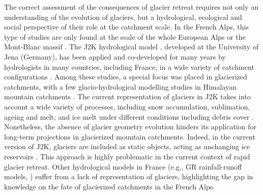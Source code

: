 The correct assessment of the consequences of glacier retreat requires not only an understanding of the evolution of glaciers, but a hydrological, ecological and social perspective of their role at the catchment scale. In the French Alps, this type of studies are only found at the scale of the whole European Alps \citep{coppola_impact_2018} or the Mont-Blanc massif \citep{laurent_impact_2020}. The J2K hydrological model \citep{krause_quantifying_2002}, developed at the University of Jena (Germany), has been applied and co-developed for many years by hydrologists in many countries, including France, in a wide variety of catchment configurations \citep{branger_investigating_2012, braud_j2000-rhone_2017, horner_information_2020}. Among these studies, a special focus was placed in glacierized catchments, with a few glacio-hydrological modelling studies in Himalayan mountain catchments \citep{gao_test_2012, nepal_understanding_2014}. The current representation of glaciers in J2K takes into account a wide variety of processes, including snow accumulation, sublimation, ageing and melt; and ice melt under different conditions including debris cover \citep{nepal_understanding_2014}. Nonetheless, the absence of glacier geometry evolution hinders its application for long-term projections in glacierized mountain catchments. Indeed, in the current version of J2K, glaciers are included as static objects, acting as unchanging ice reservoirs \citep{nepal_understanding_2014}. This approach is highly problematic in the current context of rapid glacier retreat.  Other hydrological models in France (e.g., GR rainfall-runoff models, \cite{coron_suite_2017}) suffer from a lack of representation of glaciers, highlighting the gap in knowledge on the fate of glacierized catchments in the French Alps. 

